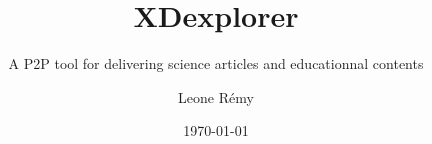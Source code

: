 \author{Leone Rémy}
\title{XDexplorer}
\subtitle{A P2P tool for delivering science articles and educationnal contents}
\date{\today}
